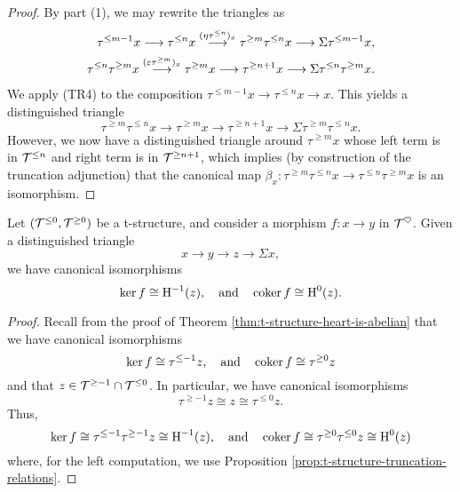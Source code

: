 \begin{proof}
By part (1), we may rewrite the triangles as
\begin{align*}
	\tau^{\leq m-1}x \longrightarrow \tau^{\leq n}x \overset{(\eta\tau^{\leq n})_x}{\longrightarrow} \tau^{\geq m}\tau^{\leq n}x \longrightarrow \Sigma\tau^{\leq m-1}x, \\
	\tau^{\leq n}\tau^{\geq m}x \overset{(\varepsilon\tau^{\geq m})_x}{\longrightarrow} \tau^{\geq m}x \longrightarrow \tau^{\geq n+1}x \longrightarrow \Sigma\tau^{\leq n}\tau^{\geq m}x.
\end{align*}
We apply (TR4) to the composition \(\tau^{\leq m-1}x \to \tau^{\leq n}x \to x\). This yields a distinguished triangle
\[ \tau^{\geq m}\tau^{\leq n}x \to \tau^{\geq m}x \to \tau^{\geq n+1}x \to \Sigma\tau^{\geq m}\tau^{\leq n}x. \]
However, we now have a distinguished triangle around \(\tau^{\geq m}x\) whose left term is in \(\mathcal{T}^{\leq n}\) and right term is in \(\mathcal{T}^{\geq n+1}\), which implies (by construction
of the truncation adjunction) that the canonical map \(\beta_x\!:\tau^{\geq m}\tau^{\leq n}x \to \tau^{\leq n}\tau^{\geq m}x \) is an isomorphism.
\end{proof}

\begin{corollary}\label{corollary:t-structure-kernel-and-cokernel-in-heart-cohomology}
	Let \((\mathcal{T}^{\leq 0},\mathcal{T}^{\geq 0})\) be a t-structure, and consider a morphism \(f\!:x\to y\) in \(\mathcal{T}^\heartsuit\). Given a distinguished triangle
	\[ x \to y \to z \to \Sigma x, \]
	we have canonical isomorphisms
	\[ \ker{f} \cong \operatorname{H}^{-1}(z),\quad \text{and}\quad \operatorname{coker}{f} \cong \operatorname{H}^0(z).  \]
\end{corollary}
\begin{proof}
Recall from the proof of Theorem \ref{thm:t-structure-heart-is-abelian} that we have canonical isomorphisms
\[ \ker{f} \cong \tau^{\leq -1}z,\quad \text{and}\quad \operatorname{coker}{f} \cong \tau^{\geq 0}z  \]
and that \(z\in\mathcal{T}^{\geq -1}\cap\mathcal{T}^{\leq 0}\). In particular, we have canonical isomorphisms
\[ \tau^{\geq -1}z \cong z \cong \tau^{\leq 0}z. \]
Thus,
\[ \ker{f} \cong \tau^{\leq -1}\tau^{\geq -1}z \cong \operatorname{H}^{-1}(z),\quad \text{and}\quad \operatorname{coker}{f} \cong \tau^{\geq 0}\tau^{\leq 0}z \cong \operatorname{H}^0(z) \]
where, for the left computation, we use Proposition \ref{prop:t-structure-truncation-relations}.
\end{proof}

